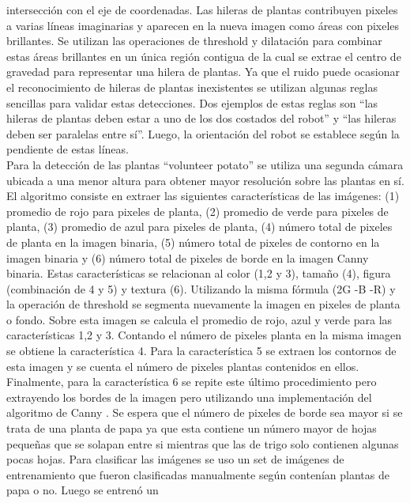 	intersección con el eje de coordenadas. Las hileras de plantas 
	contribuyen pixeles a varias líneas imaginarias y aparecen en la 
	nueva imagen como áreas con pixeles brillantes. Se utilizan las 
	operaciones de threshold y dilatación para combinar estas áreas 
	brillantes en un única región contigua de la cual se 
	extrae el centro de gravedad para representar una hilera de 
	plantas. Ya que el ruido puede ocasionar el reconocimiento de 
	hileras de plantas inexistentes se utilizan algunas reglas 
	sencillas para validar estas detecciones. Dos ejemplos de estas 
	reglas son ``las hileras de plantas deben estar a uno de los dos 
	costados del robot'' y ``las hileras deben ser paralelas entre sí''.
	Luego, la orientación del robot se establece según la pendiente de 
	estas líneas.\\
	\indent Para la detección de las plantas ``volunteer potato'' se 
	utiliza una segunda cámara ubicada a una menor altura para obtener 
	mayor resolución sobre las plantas en sí. El algoritmo consiste en 
	extraer las siguientes características de las imágenes: (1) 
	promedio de rojo para pixeles de planta, (2) promedio de verde para 
	pixeles de planta, (3) promedio de azul para pixeles de planta, (4) 
	número total de pixeles de planta en la imagen binaria, (5) número 
	total de pixeles de contorno en la imagen binaria y (6) número 
	total de pixeles de borde en la imagen Canny binaria. Estas 
	características se relacionan al color (1,2 y 3), tamaño (4), figura 
	(combinación de 4 y 5) y textura (6).  Utilizando la misma fórmula 
	(2G -B -R) y la operación de threshold se segmenta nuevamente la imagen 
	 en pixeles de planta o fondo. Sobre esta imagen se calcula el 
	 promedio de rojo, azul y verde para las características 1,2 y 3. 
	 Contando el número de pixeles planta en la misma 
	 imagen se obtiene la característica 4. Para la característica 5 
	 se extraen los contornos de esta imagen y se cuenta el número de 
	 pixeles plantas contenidos en ellos. Finalmente, para la característica 6 se 
	 repite este último procedimiento pero extrayendo los bordes de la 
	 imagen pero  
	 utilizando una implementación del algoritmo de Canny 
	 \cite{Canny:1986:ACA}. Se espera que el número de pixeles de 
	 borde sea mayor si se trata de una planta de papa ya que esta 
	 contiene un número mayor de hojas pequeñas que se solapan entre si 
	 mientras que las de trigo solo contienen algunas pocas hojas. Para 
	 clasificar las imágenes se uso un set de imágenes de entrenamiento
	 que fueron clasificadas manualmente según contenían 
	 plantas de papa o no. Luego se entrenó un 
